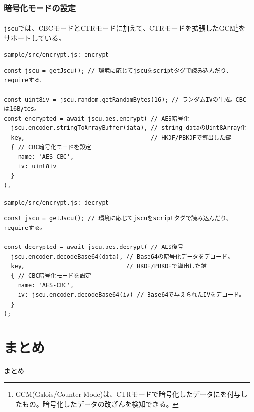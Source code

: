 \documentclass[12pt,dvipdfmx]{beamer}
\begin{document}
\begin{frame}[fragile]
\frametitle{暗号化モードの設定}
\texttt{jscu}では、CBCモードとCTRモードに加えて、CTRモードを拡張したGCM\footnote[frame]{\scriptsize GCM(Galois/Counter Mode)は、CTRモードで暗号化したデータにを付与したもの。暗号化したデータの改ざんを検知できる。}をサポートしている。

\begin{exampleblock}{\small \texttt{sample/src/encrypt.js: encrypt}}
\scriptsize
\begin{verbatim}
const jscu = getJscu(); // 環境に応じてjscuをscriptタグで読み込んだり、requireする。

const uint8iv = jscu.random.getRandomBytes(16); // ランダムIVの生成。CBCは16Bytes。
const encrypted = await jscu.aes.encrypt( // AES暗号化
  jseu.encoder.stringToArrayBuffer(data), // string dataのUint8Array化
  key,                                    // HKDF/PBKDFで導出した鍵
  { // CBC暗号化モードを設定
    name: 'AES-CBC',
    iv: uint8iv
  }
);
\end{verbatim}
\end{exampleblock}
\end{frame}

\begin{frame}[fragile]
\begin{exampleblock}{\small \texttt{sample/src/encrypt.js: decrypt}}
\scriptsize
\begin{verbatim}
const jscu = getJscu(); // 環境に応じてjscuをscriptタグで読み込んだり、requireする。

const decrypted = await jscu.aes.decrypt( // AES復号
  jseu.encoder.decodeBase64(data), // Base64の暗号化データをデコード。
  key,                             // HKDF/PBKDFで導出した鍵
  { // CBC暗号化モードを設定
    name: 'AES-CBC',
    iv: jseu.encoder.decodeBase64(iv) // Base64で与えられたIVをデコード。
  }
);
\end{verbatim}
\end{exampleblock}
\end{frame}



\section{まとめ}
\begin{frame}
 \centering
 {\Large まとめ}
\end{frame}
\end{document}
